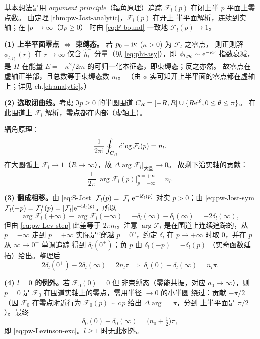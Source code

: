 \begin{proof*}
基本想法是用 \emph{argument principle}（辐角原理）追踪
$\mathcal F_l(p)$ 在闭上半 $p$ 平面上零点数。
由定理 \ref{thm:pw-Jost-analytic}，$\mathcal F_l(p)$ 在开上
半平面解析，连续到实轴；在 $|p|\to\infty$（$\Im p\ge 0$）
时由 \eqref{eq:F-bound} 一致地 $\mathcal F_l(p)\to 1$。

\textbf{(1) 上半平面零点 $\Leftrightarrow$ 束缚态。}
若 $p_0=\mathrm{i}\kappa$ ($\kappa>0$) 为 $\mathcal F_l$ 之零点，
则正则解 $\phi_{l,p_0}(r)$ 在 $r\to\infty$ 仅含 $\hat h_l^-$
分量（见 \eqref{eq:phi-asy}），即
$\phi_{l,p_0}\sim\mathrm{e}^{-\kappa r}$ 指数衰减，是 $H$ 在能量
$E=-\kappa^2/2m$ 的可归一化本征态，即束缚态；反之亦然。
故零点在虚轴正半部，且总数等于束缚态数 $n_l$。
（由 $\phi$ 实可知开上半平面的零点都在虚轴上；详见
ch.\ref{ch:analytic}。）

\textbf{(2) 选取闭曲线。}考虑 $\Im p\ge 0$ 的半圆围道
$C_R=[-R,R]\cup\{R\mathrm{e}^{\mathrm{i}\theta},0\le\theta\le\pi\}$。
在此围道上 $\mathcal F_l$ 解析，零点都在内部（虚轴上）。

辐角原理：
\[
\frac{1}{2\pi\mathrm{i}}\oint_{C_R}\mathrm{d}\!\log\mathcal F_l(p)=n_l.
\]
在大圆弧上 $\mathcal F_l\to 1$（$R\to\infty$），故
$\Delta\arg\mathcal F_l\big|_{\text{大圆}}\to 0$。
故剩下沿实轴的贡献：
\begin{equation}\label{eq:pw-Lev-step}
\frac{1}{2\pi}\bigl[\arg\mathcal F_l(p)\bigr]_{p=-\infty}^{p=+\infty}
= n_l.
\end{equation}

\textbf{(3) 翻成相移。}由 \eqref{eq:S-Jost}
$\mathcal F_l(p)=|\mathcal F_l|\mathrm{e}^{-\mathrm{i}\delta_l(p)}$ 对实
$p>0$；由 \eqref{eq:pw-Jost-sym}
$\mathcal F_l(-p)=\mathcal F_l^*(p)
=|\mathcal F_l|\mathrm{e}^{+\mathrm{i}\delta_l(p)}$。所以
\[
\arg\mathcal F_l(+\infty)-\arg\mathcal F_l(-\infty)
= -\delta_l(\infty)-\delta_l(\infty)=-2\delta_l(\infty),
\]
但由 \eqref{eq:pw-Lev-step} 此差等于 $2\pi n_l$。注意
$\arg\mathcal F_l$ 是在围道上连续追踪的，从 $p=-\infty$ 走到
$p=+\infty$ 实际是“穿越 $p=0$”，约定 $\delta_l$ 在
$p\to+\infty$ 时取 $0$，并在 $p$ 从 $\infty\to 0^+$ 单调追踪
得到 $\delta_l(0^+)$；负 $p$ 由 $\delta_l(-p)=-\delta_l(p)$
（实奇函数延拓）给出。整理后
\[
2\delta_l(0^+)-2\delta_l(\infty) = 2 n_l\pi
\;\Longrightarrow\;
\delta_l(0)-\delta_l(\infty)=n_l\pi.
\]

\textbf{(4) $l=0$ 的例外。}若 $\mathcal F_0(0)=0$ 但
非束缚态（零能共振，对应 $a_0\to\infty$），则 $p=0$ 是
$\mathcal F_0$ 在围道实轴上的零点，需用半径 $\to 0$ 的小半圆
绕过：贡献 $-\pi/2$（因 $\mathcal F_0$ 在零点附近行为
$\mathcal F_0(p)\sim c\,p$ 给出 $\Delta\arg=\pi$，分到
上半平面是 $\pi/2$）。最终
\[
\delta_0(0)-\delta_0(\infty)=\bigl(n_0+\tfrac12\bigr)\pi,
\]
即 \eqref{eq:pw-Levinson-exc}。$l\ge 1$ 时无此例外。
\end{proof*}

